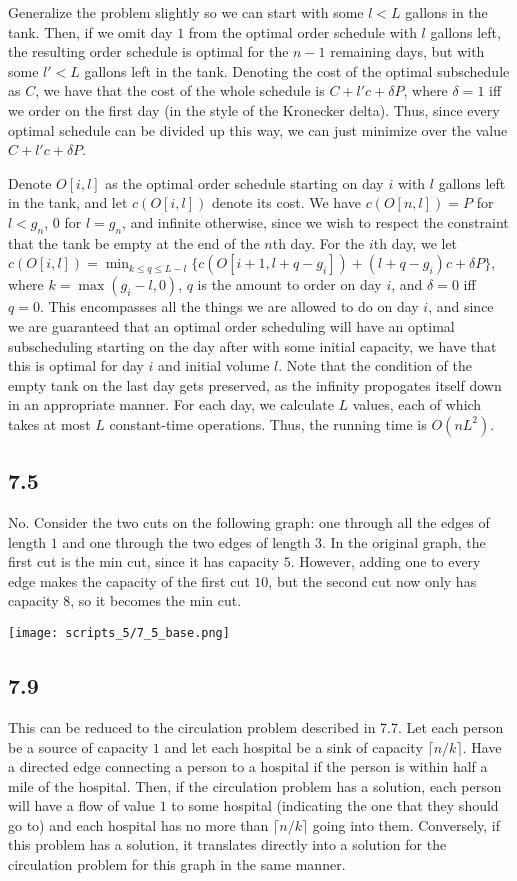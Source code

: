 \documentclass{article}
\begin{document}
Generalize the problem slightly so we can start with some $l<L$ gallons in the tank. Then, if we omit day $1$ from the optimal order schedule with $l$ gallons left, the resulting order schedule is optimal for the $n-1$ remaining days, but with some $l'<L$ gallons left in the tank. Denoting the cost of the optimal subschedule as $C$, we have that the cost of the whole schedule is $C+l'c+\delta P$, where $\delta=1$ iff we order on the first day (in the style of the Kronecker delta). Thus, since every optimal schedule can be divided up this way, we can just minimize over the value $C+l'c+\delta P$.

Denote $O[i,l]$ as the optimal order schedule starting on day $i$ with $l$ gallons left in the tank, and let $c(O[i,l])$ denote its cost. We have $c(O[n,l])=P$ for $l<g_n$, $0$ for $l=g_n$, and infinite otherwise, since we wish to respect the constraint that the tank be empty at the end of the $n$th day. For the $i$th day, we let $\displaystyle c(O[i,l])=\min_{k\leq q\leq L-l}\{c(O[i+1,l+q-g_i])+(l+q-g_i)c+\delta P\}$, where $k=\max(g_i-l,0)$, $q$ is the amount to order on day $i$, and $\delta=0$ iff $q=0$. This encompasses all the things we are allowed to do on day $i$, and since we are guaranteed that an optimal order scheduling will have an optimal subscheduling starting on the day after with some initial capacity, we have that this is optimal for day $i$ and initial volume $l$. Note that the condition of the empty tank on the last day gets preserved, as the infinity propogates itself down in an appropriate manner. For each day, we calculate $L$ values, each of which takes at most $L$ constant-time operations. Thus, the running time is $O(nL^2)$.
\subsection*{7.5}
No. Consider the two cuts on the following graph: one through all the edges of length $1$ and one through the two edges of length $3$. In the original graph, the first cut is the min cut, since it has capacity $5$. However, adding one to every edge makes the capacity of the first cut $10$, but the second cut now only has capacity $8$, so it becomes the min cut.

\texttt{[image: scripts\_5/7\_5\_base.png]}
\subsection*{7.9}
This can be reduced to the circulation problem described in 7.7. Let each person be a source of capacity $1$ and let each hospital be a sink of capacity $\lceil n/k\rceil$. Have a directed edge connecting a person to a hospital if the person is within half a mile of the hospital. Then, if the circulation problem has a solution, each person will have a flow of value $1$ to some hospital (indicating the one that they should go to) and each hospital has no more than $\lceil n/k\rceil$ going into them. Conversely, if this problem has a solution, it translates directly into a solution for the circulation problem for this graph in the same manner.
\end{document}
